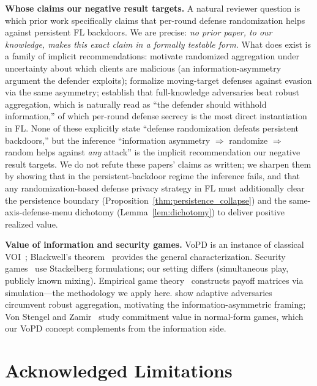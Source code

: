 \documentclass{article}
\begin{document}
\textbf{Whose claims our negative result targets.} A natural reviewer question is which prior work specifically claims that per-round defense randomization helps against persistent FL backdoors. We are precise: \emph{no prior paper, to our knowledge, makes this exact claim in a formally testable form.} What does exist is a family of implicit recommendations: \citet{xie2018mitigating} motivate randomized aggregation under uncertainty about which clients are malicious (an information-asymmetry argument the defender exploits); \citet{liu2018towards} formalize moving-target defenses against evasion via the same asymmetry; \citet{bhagoji2019analyzing} establish that full-knowledge adversaries beat robust aggregation, which is naturally read as ``the defender should withhold information,'' of which per-round defense secrecy is the most direct instantiation in FL. None of these explicitly state ``defense randomization defeats persistent backdoors,'' but the inference ``information asymmetry $\Rightarrow$ randomize $\Rightarrow$ random helps against \emph{any} attack'' is the implicit recommendation our negative result targets. We do not refute these papers' claims as written; we sharpen them by showing that in the persistent-backdoor regime the inference fails, and that any randomization-based defense privacy strategy in FL must additionally clear the persistence boundary (Proposition~\ref{thm:persistence_collapse}) and the same-axis-defense-menu dichotomy (Lemma~\ref{lem:dichotomy}) to deliver positive realized value.

\textbf{Value of information and security games.} VoPD is an instance of classical VOI~\citep{howard1966information}; Blackwell's theorem~\citep{blackwell1953equivalent} provides the general characterization. Security games~\citep{tambe2011security} use Stackelberg formulations; our setting differs (simultaneous play, publicly known mixing). Empirical game theory~\citep{wellman2006methods,walsh2002analyzing} constructs payoff matrices via simulation---the methodology we apply here. \citet{shejwalkar2021manipulating} show adaptive adversaries circumvent robust aggregation, motivating the information-asymmetric framing; Von Stengel and Zamir~\citep{vonstengel2010leadership} study commitment value in normal-form games, which our VoPD concept complements from the information side.

\section{Acknowledged Limitations}
\label{sec:limitations}
\end{document}
